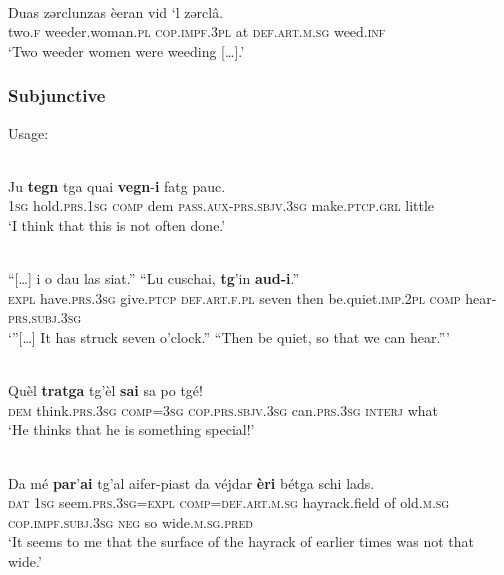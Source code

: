 \ea\label{}
 {\citealt[132]{Büchli1966}}\\
\gll    Duas zǝrclunzas èeran vid ‘l zǝrclâ.\\
     two.\textsc{f} weeder.woman.\textsc{pl} \textsc{cop.impf.3pl} at \textsc{def.art.m.sg} weed.\textsc{inf}\\
\glt `Two weeder women were weeding […].'
\z




\subsubsection{Subjunctive}


Usage:

\ea\label{}
\\
\gll  Ju \textbf{tegn} tga quai \textbf{vegn}-\textbf{i} fatg pauc.  \\
    \textsc{1sg} hold.\textsc{prs.1sg} \textsc{comp} {dem} \textsc{pass.aux}-\textsc{prs.sbjv.3sg} make.\textsc{ptcp.grl} little\\
\glt `I think that this is not often done.'
\z


\ea\label{ex: }
\\
\gll  “[…] i o dau las siat.” “Lu cuschai, \textbf{tg}’in \textbf{aud-i}.”\\
     […] \textsc{expl} have.\textsc{prs.3sg} give.\textsc{ptcp} \textsc{def.art.f.pl} seven then be.quiet.\textsc{imp.2pl} \textsc{comp} hear-\textsc{prs.subj.3sg}\\
\glt `”[…] It has struck seven o’clock.” “Then be quiet, so that we can hear.”'
\z

\ea\label{}
\\
\gll  Quèl \textbf{tratga} tg’èl \textbf{sai} sa po tgé!\\
    \textsc{dem} think.\textsc{prs.3sg} \textsc{comp=3sg} \textsc{cop.prs.sbjv.3sg} can.\textsc{prs.3sg} \textsc{interj} what \\
\glt `He thinks that he is something special!'
\z

\ea\label{}
\\
\gll  Da mé \textbf{par}'\textbf{ai} tg'al aifer-piast da véjdar \textbf{èri} bétga schi lads.\\
    \textsc{dat} \textsc{1sg} seem.\textsc{prs.3sg=expl} \textsc{comp=def.art.m.sg} hayrack.field  of old.\textsc{m.sg} \textsc{cop.impf.subj.3sg} \textsc{neg} so wide.\textsc{m.sg.pred} \\
\glt `It seems to me that the surface of the hayrack of earlier times was not that wide.'
\z

